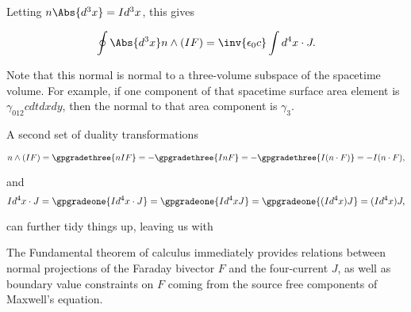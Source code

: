 {Letting \( n \Abs{d^3 x} = I d^3 x \), this gives

\begin{dmath}\label{eqn:fundamentalTheoremOfCalculus:420}
\oint \Abs{d^3 x} n \wedge (I F) = \inv{\epsilon_0 c} \int d^4 x \cdot J.
\end{dmath}

Note that this normal is normal to a three-volume subspace of the spacetime volume.  For example, if one component of that spacetime surface area element is \( \gamma_{012} c dt dx dy \), then the normal to that area component is \( \gamma_3 \).

A second set of duality transformations

\begin{dmath}\label{eqn:fundamentalTheoremOfCalculus:440}
n \wedge (IF)
=
\gpgradethree{ n I F}
=
-\gpgradethree{ I n F}
=
-\gpgradethree{ I (n \cdot F)}
=
-I (n \cdot F),
\end{dmath}

and
\begin{dmath}\label{eqn:fundamentalTheoremOfCalculus:460}
I d^4 x \cdot J
=
\gpgradeone{ I d^4 x \cdot J }
=
\gpgradeone{ I d^4 x J }
=
\gpgradeone{ (I d^4 x) J }
=
(I d^4 x) J,
\end{dmath}

can further tidy things up, leaving us with


The Fundamental theorem of calculus immediately provides relations between normal projections of the Faraday bivector \( F \) and the four-current \( J \), as well as boundary value constraints on \( F \) coming from the source free components of Maxwell's equation.
} %

